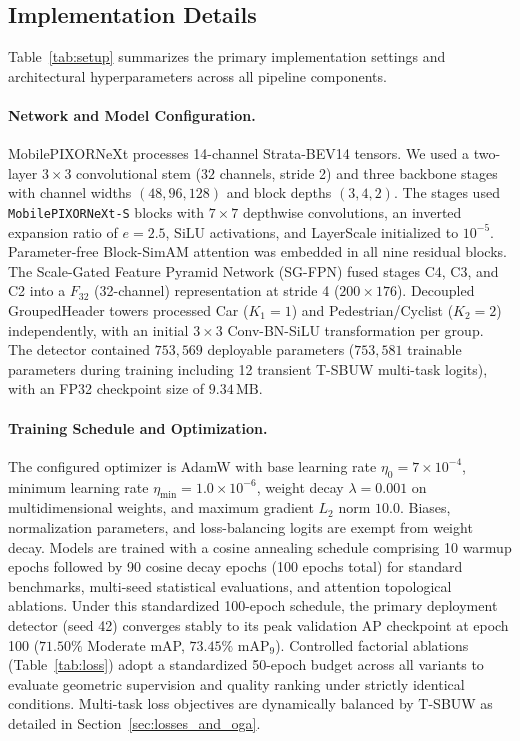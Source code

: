 \subsection{Implementation Details}
\label{sec:implementation_details}


Table~\ref{tab:setup} summarizes the primary implementation settings and architectural hyperparameters across all pipeline components.

\paragraph{Network and Model Configuration.}
MobilePIXORNeXt processes 14-channel Strata-BEV14 tensors. We used a two-layer $3 \times 3$ convolutional stem ($32$ channels, stride 2) and three backbone stages with channel widths $(48, 96, 128)$ and block depths $(3, 4, 2)$. The stages used \texttt{MobilePIXORNeXt-S} blocks with $7 \times 7$ depthwise convolutions, an inverted expansion ratio of $e=2.5$, SiLU activations, and LayerScale initialized to $10^{-5}$. Parameter-free Block-SimAM attention was embedded in all nine residual blocks. The Scale-Gated Feature Pyramid Network (SG-FPN) fused stages C4, C3, and C2 into a $F_{32}$ (32-channel) representation at stride 4 ($200 \times 176$). Decoupled GroupedHeader towers processed Car ($K_1=1$) and Pedestrian/Cyclist ($K_2=2$) independently, with an initial $3 \times 3$ Conv-BN-SiLU transformation per group. The detector contained $753{,}569$ deployable parameters ($753{,}581$ trainable parameters during training including 12 transient T-SBUW multi-task logits), with an FP32 checkpoint size of $9.34\,\text{MB}$.

\paragraph{Training Schedule and Optimization.}
The configured optimizer is AdamW with base learning rate $\eta_0 = 7 \times 10^{-4}$, minimum learning rate $\eta_{\min} = 1.0 \times 10^{-6}$, weight decay $\lambda = 0.001$ on multidimensional weights, and maximum gradient $L_2$ norm $10.0$. Biases, normalization parameters, and loss-balancing logits are exempt from weight decay. Models are trained with a cosine annealing schedule comprising 10 warmup epochs followed by 90 cosine decay epochs (100 epochs total) for standard benchmarks, multi-seed statistical evaluations, and attention topological ablations. Under this standardized 100-epoch schedule, the primary deployment detector (seed 42) converges stably to its peak validation AP checkpoint at epoch 100 ($71.50\%$ Moderate mAP, $73.45\%$ $\mathrm{mAP}_9$). Controlled factorial ablations (Table~\ref{tab:loss}) adopt a standardized 50-epoch budget across all variants to evaluate geometric supervision and quality ranking under strictly identical conditions. Multi-task loss objectives are dynamically balanced by T-SBUW as detailed in Section~\ref{sec:losses_and_oga}.

